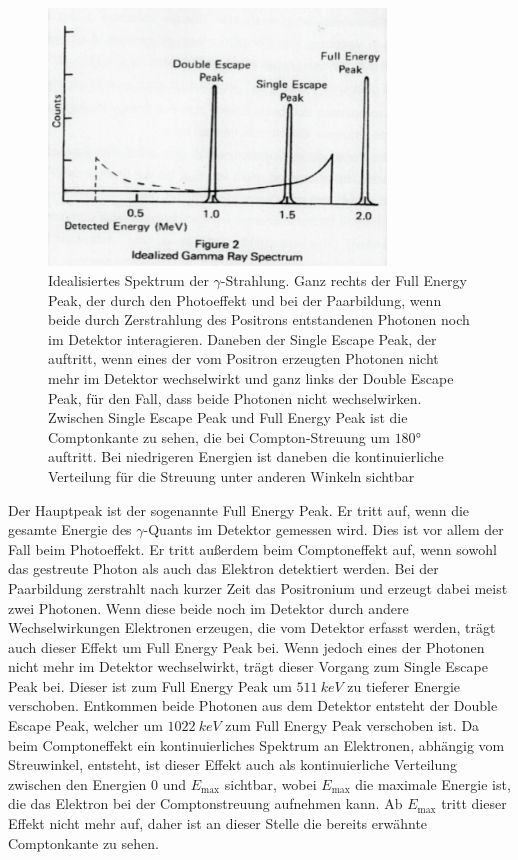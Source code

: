 \begin{figure}
	\centering
	\includegraphics[width=0.8\textwidth]{gammaray.png}
	\caption{Idealisiertes Spektrum der $\gamma$-Strahlung. Ganz rechts der Full Energy Peak, der durch den Photoeffekt und bei der Paarbildung, wenn beide durch Zerstrahlung des Positrons entstandenen Photonen noch im Detektor interagieren. Daneben der Single Escape Peak, der auftritt, wenn eines der vom Positron erzeugten Photonen nicht mehr im Detektor wechselwirkt und ganz links der Double Escape Peak, für den Fall, dass beide Photonen nicht wechselwirken. Zwischen Single Escape Peak und Full Energy Peak ist die Comptonkante zu sehen, die bei Compton-Streuung um $180$° auftritt. Bei niedrigeren Energien ist daneben die kontinuierliche Verteilung für die Streuung unter anderen Winkeln sichtbar}
	\label{idealized_spectrum}
\end{figure}

Der Hauptpeak ist der sogenannte Full Energy Peak. Er tritt auf, wenn die gesamte Energie des $\gamma$-Quants im Detektor gemessen wird. Dies ist vor allem der Fall beim Photoeffekt. Er tritt außerdem beim Comptoneffekt auf, wenn sowohl das gestreute Photon als auch das Elektron detektiert werden. Bei der Paarbildung zerstrahlt nach kurzer Zeit das Positronium und erzeugt dabei meist zwei Photonen. Wenn diese beide noch im Detektor durch andere Wechselwirkungen Elektronen erzeugen, die vom Detektor erfasst werden, trägt auch dieser Effekt um Full Energy Peak bei. Wenn jedoch eines der Photonen nicht mehr im Detektor wechselwirkt, trägt dieser Vorgang zum Single Escape Peak bei. Dieser ist zum Full Energy Peak um $\SI{511}{keV}$ zu tieferer Energie verschoben. Entkommen beide Photonen aus dem Detektor entsteht der Double Escape Peak, welcher um $\SI{1022}{keV}$ zum Full Energy Peak verschoben ist. Da beim Comptoneffekt ein kontinuierliches Spektrum an Elektronen, abhängig vom Streuwinkel, entsteht, ist dieser Effekt auch als kontinuierliche Verteilung zwischen den Energien $0$ und $E_\text{max}$ sichtbar, wobei $E_\text{max}$ die maximale Energie ist, die das Elektron bei der Comptonstreuung aufnehmen kann. Ab $E_\text{max}$ tritt dieser Effekt nicht mehr auf, daher ist an dieser Stelle die bereits erwähnte Comptonkante zu sehen.


